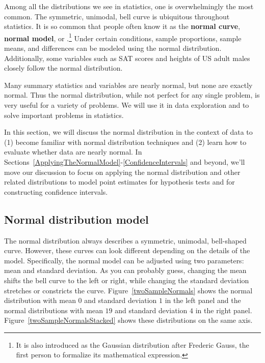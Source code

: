 
Among all the distributions we see in statistics, one is overwhelmingly the most common. The symmetric, unimodal, bell curve is ubiquitous throughout statistics. It is so common that people often know it as the \textbf{normal curve}, \textbf{normal model}, or .\footnote{It is also introduced as the Gaussian distribution after Frederic Gauss, the first person to formalize its mathematical expression.} Under certain conditions, sample proportions, sample means, and differences can be modeled using the normal distribution. Additionally, some variables such as SAT scores and heights of US adult males closely follow the normal distribution.

\begin{termBox}{
Many summary statistics and variables are nearly normal, but none are exactly normal. Thus the normal distribution, while not perfect for any single problem, is very useful for a variety of problems. We will use it in data exploration and to solve important problems in statistics.\vspace{0.7mm}}
\end{termBox}

In this section, we will discuss the normal distribution in the context of data to (1) become familiar with normal distribution techniques and (2) learn how to evaluate whether data are nearly normal. In Sections~\ref{ApplyingTheNormalModel}-\ref{ConfidenceIntervals} and beyond, we'll move our discussion to focus on applying the normal distribution and other related distributions to model point estimates for hypothesis tests and for constructing confidence intervals.

\subsection{Normal distribution model}
\label{NormalDistributionModelSubsection}

The normal distribution always describes a symmetric, unimodal, bell-shaped curve. However, these curves can look different depending on the details of the model. Specifically, the normal model can be adjusted using two parameters: mean and standard deviation. As you can probably guess, changing the mean shifts the bell curve to the left or right, while changing the standard deviation stretches or constricts the curve. Figure~\ref{twoSampleNormals} shows the normal distribution with mean $0$ and standard deviation $1$ in the left panel and the normal distributions with mean $19$ and standard deviation $4$ in the right panel. Figure~\ref{twoSampleNormalsStacked} shows these distributions on the same axis.

